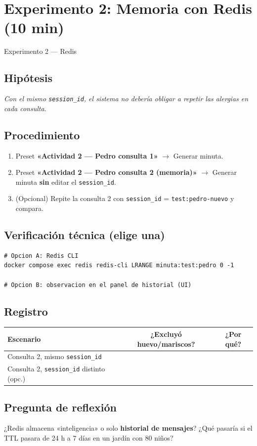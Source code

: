 \documentclass[12pt,a4paper]{article}
\begin{document}
\section{Experimento 2: Memoria con Redis (10 min)}

\begin{experbox}{Experimento 2 --- Redis}
\subsection*{Hipótesis}
\textit{Con el mismo \texttt{session\_id}, el sistema no debería obligar a repetir
las alergias en cada consulta.}

\subsection*{Procedimiento}
\begin{enumerate}[noitemsep]
  \item Preset \textbf{«Actividad 2 --- Pedro consulta 1»} $\rightarrow$ Generar minuta.
  \item Preset \textbf{«Actividad 2 --- Pedro consulta 2 (memoria)»} $\rightarrow$
        Generar minuta \textbf{sin} editar el \texttt{session\_id}.
  \item (Opcional) Repite la consulta 2 con \texttt{session\_id} =
        \texttt{test:pedro-nuevo} y compara.
\end{enumerate}

\subsection*{Verificación técnica (elige una)}
\begin{lstlisting}[style=shellstyle, caption={Opción A: Redis CLI}]
# Opcion A: Redis CLI
docker compose exec redis redis-cli LRANGE minuta:test:pedro 0 -1

# Opcion B: observacion en el panel de historial (UI)
\end{lstlisting}

\subsection*{Registro}
\begin{table}[h]
\centering
\small
\begin{tabular}{@{}p{5.5cm}cc@{}}
\toprule
\textbf{Escenario} & \textbf{¿Excluyó huevo/mariscos?} & \textbf{¿Por qué?} \\
\midrule
Consulta 2, mismo \texttt{session\_id} & & \\[1.5ex]
Consulta 2, \texttt{session\_id} distinto (opc.) & & \\
\bottomrule
\end{tabular}
\end{table}

\subsection*{Pregunta de reflexión}
¿Redis almacena «inteligencia» o solo \textbf{historial de mensajes}? ¿Qué pasaría
si el TTL pasara de 24 h a 7 días en un jardín con 80 niños?
\end{experbox}
\end{document}
